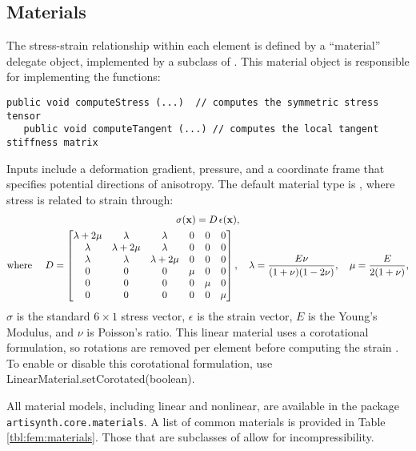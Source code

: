 \subsection{Materials}
\label{sec:fem:materials}

The stress-strain relationship within each element is defined by a ``material''
delegate object, implemented by a subclass of 
.  This material object is 
responsible for implementing the functions:
%
\begin{lstlisting}[]
   public void computeStress (...)  // computes the symmetric stress tensor
   public void computeTangent (...) // computes the local tangent stiffness matrix
\end{lstlisting}
%
Inputs include a deformation gradient, pressure, and a coordinate frame that
specifies potential directions of anisotropy. The default material type is 
, where stress is related 
to strain through:
\begin{gather}
  \sigma({\bf x}) = D\,\epsilon({\bf x}), \label{eqn:fem:mat:linear}\\
  \text{where }\quad D = \begin{bmatrix}
	  \lambda +2\mu & \lambda & \lambda  & 0 & 0 & 0\\
	  \lambda &  \lambda +2\mu & \lambda & 0 & 0 & 0\\
	  \lambda & \lambda & \lambda +2\mu & 0 & 0 & 0\\
	  0 & 0 & 0 & \mu & 0 & 0\\
	  0 & 0 & 0 & 0 & \mu & 0\\
	  0 & 0 & 0 & 0 & 0 & \mu
        \end{bmatrix}, \quad \lambda = \dfrac{E\nu}{(1+\nu)(1-2\nu)},  \quad
      \mu = \dfrac{E}{2(1+\nu)},\notag
\end{gather}
$\sigma$ is the standard $6\times 1$ stress vector, $\epsilon$ is the 
strain vector, $E$ is the Young's Modulus, and $\nu$ is Poisson's ratio. This
linear material uses a corotational formulation, so rotations are removed
per element before computing the strain \cite{ngan:fem:2008}.  To enable or
disable this corotational formulation, use 
%
{LinearMaterial.setCorotated(boolean)}.

All material models, including linear and nonlinear, are available in the package  
{\tt artisynth.core.materials}.  A list of common materials is provided in 
Table \ref{tbl:fem:materials}.  Those that are subclasses of 
 allow for 
incompressibility.


